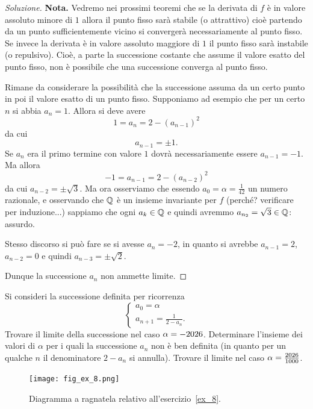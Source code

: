\begin{proof}[Soluzione]
  \textbf{Nota.} Vedremo nei prossimi teoremi che
  se la derivata di $f$ è in valore assoluto minore di
  $1$ allora il punto fisso sarà stabile (o attrattivo) cioè partendo
  da un punto sufficientemente vicino si convergerà necessariamente al
  punto fisso. Se invece la derivata è in valore assoluto maggiore di
  $1$ il punto fisso sarà instabile (o repulsivo). Cioè, a parte la
  successione costante che assume il valore esatto del punto fisso,
  non è
  possibile che una successione converga al punto fisso.

  Rimane da considerare la possibilità che la successione assuma da un
  certo punto in poi il valore esatto di un punto fisso. Supponiamo ad
  esempio che per un certo $n$ si abbia $a_n=1$. Allora si deve avere
  \[
  1 = a_n = 2-(a_{n-1})^2
  \]
  da cui
  \[
  a_{n-1} = \pm 1.
  \]
  Se $a_n$ era il primo termine con valore $1$ dovrà necessariamente
  essere $a_{n-1} = -1$. Ma allora
  \[
  -1 = a_{n-1} = 2-(a_{n-2})^2
  \]
  da cui $a_{n-2} = \pm \sqrt 3$. Ma ora osserviamo che essendo $a_0=
  \alpha = \frac 1 {42}$ un numero razionale, e osservando che ${\mathbb Q}$ è un
  insieme invariante per $f$ (perché? verificare per induzione...)
  sappiamo che ogni $a_k \in {\mathbb Q}$ e quindi
  avremmo $a_{n_2} = \sqrt 3 \in {\mathbb Q}$: assurdo.

  Stesso discorso si può fare se si avesse $a_n=-2$, in quanto si
  avrebbe $a_{n-1} = 2$, $a_{n-2} = 0$ e quindi $a_{n-3}=\pm \sqrt 2$.

  Dunque la successione $a_n$ non ammette limite.
\end{proof}

\begin{exercise}\label{ex_8}
  Si consideri la successione definita per ricorrenza
  \[
  \begin{cases}
    a_0 = \alpha\\
    a_{n+1} = \frac{1}{2-a_n}.
  \end{cases}
  \]
  Trovare il limite della successione nel caso $\alpha =
  -\the\year$. Determinare l'insieme dei valori di $\alpha$ per i quali la
  successione $a_n$ non è ben definita (in quanto per un qualche $n$ il
  denominatore $2-a_n$ si annulla).
  Trovare il limite nel caso $\alpha=\frac{\the\year}{1000}$.
\end{exercise}

\newsavebox{\qrexotto}
\begin{figure}
 \begin{center}
    \texttt{[image: fig\_ex\_8.png]}
  \end{center}
  \caption{Diagramma a ragnatela relativo
    all'esercizio~\ref{ex_8}.\\\\
    \usebox{\qrexotto}}
  \label{fig_ex_8}
\end{figure}


